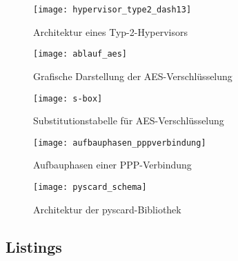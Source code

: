   \begin{figure}[htp]
  \begin{center}
   \texttt{[image: hypervisor\_type2\_dash13]}
  \end{center}
  \caption[Architektur eines Typ-2-Hypervisors]{Architektur eines Typ-2-Hypervisors \cite{dash13}}
  \label{abb:hypervisor_type2}
 \end{figure}

  \begin{figure}[htp]
  \begin{center}
   \texttt{[image: ablauf\_aes]}
  \end{center}
  \caption[Grafische Darstellung der AES-Verschlüsselung]{Grafische Darstellung der AES-Verschlüsselung \cite{paar10}}
  \label{abb:funktion_aes}
 \end{figure}
 
  \begin{figure}[htp]
  \begin{center}
   \texttt{[image: s-box]}
  \end{center}
  \caption[Substitutionstabelle für AES-Verschlüsselung]{Substitutionstabelle für AES-Verschlüsselung \cite{paar10}}
  \label{abb:s-box}
 \end{figure}
 
 \begin{figure}[htp]
  \begin{center}
   \texttt{[image: aufbauphasen\_pppverbindung]}
  \end{center}
  \caption[Aufbauphasen einer PPP-Verbindung]{Aufbauphasen einer PPP-Verbindung \cite{zackercomptia}}
  \label{abb:aufbauphasen_pppverbindung}
 \end{figure}

 \begin{figure}[htp]
  \begin{center}
   \texttt{[image: pyscard\_schema]}
  \end{center}
  \caption[Architektur der pyscard-Bibliothek]{Architektur der pyscard-Bibliothek \cite{pyscardweb}}
  \label{abb:pyscard_schema}
 \end{figure}

 \clearpage

\subsection{Listings}

  

